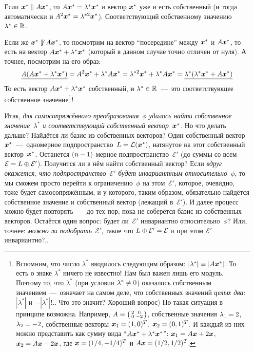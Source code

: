 \documentclass[a4paper,12pt]{article}
\theoremstyle{remark}
\begin{document}
  Если $\bds x^* \hm\parallel A \bds x^*$, то $A \bds x^* \hm= \lambda^* \bds x^*$ и вектор $\boldsymbol x^*$ уже и есть собственный (и тогда автоматически и $A^2 \bds x^* \hm= \lambda^{*2} \bds x^*$).
  Соответствующий собственному значению~$\lambda^* \hm\in \RR$.
  
  Если же $\bds x^* \hm{\not\parallel} A \bds x^*$, то посмотрим на вектор ``посередине'' между $\boldsymbol x^*$ и $A \boldsymbol x^*$, то есть на вектор $A \bds x^* \hm+ \lambda^* \bds x^*$ (который в данном случае точно отличен от нуля).
  А точнее, посмотрим на его образ:
  \[
    \underline{A (A \boldsymbol x^* + \lambda^* \boldsymbol x^*)} = A^2 \boldsymbol x^* + \lambda^* A \boldsymbol x^* = \lambda^{*2} \boldsymbol x^* + \lambda^* A \boldsymbol x^* = \underline{\lambda^* (\lambda^* \boldsymbol x^* + A \boldsymbol x^*)}
  \]
  То есть вектор $A \bds x^* \hm+ \lambda^* \bds x^*$ собственный, и $\lambda^* \hm\in \RR$~---~это соответствующее собственное значение\footnote{Вспомним, что число $\lambda^*$ вводилось следующим образом: $|\lambda^*| \hm\equiv |A \bds x^*|$. То есть о знаке $\lambda^*$ ничего не известно! Нам был важен лишь его модуль. Поэтому то, что $\lambda^*$ (при условии $\lambda^* \hm{\not=} 0$) оказалось собственным значением~---~означает на самом деле, что собственных значений \emph{целых два}: $|\lambda^*|$ и $-|\lambda^*|$!.. Что это значит? Хороший вопрос) Но такая ситуация в принципе возможна. Например, $A \hm= \left(\begin{smallmatrix}2 & 0 \\ 0 & -2\end{smallmatrix}\right)$, собственные значения $\lambda_1 \hm= 2$, $\lambda_2 \hm= -2$, собственные векторы $\bds x_1 \hm= (1, 0)^T$, $\bds x_2 \hm= (0, 1)^T$. И каждый из них можно представить как сумму вида ``$A \bds x^* \hm+ \lambda^* \bds x^*$'': $\bds x_1 \hm= A \bds x \hm+ 2 \bds x$, $\bds x_2 \hm= A \bds x \hm- 2 \bds x$, где $\bds x \hm= (1/4, -1/4)^T$ и $A \bds x \hm= (1/2, 1/2)^T$.}!
  
  Итак, \emph{для самосопряжённого преобразования~$\phi$ удалось найти собственное значение~$\lambda^*$ и соответствующий собственный вектор~$\boldsymbol x^*$}.
  Но что делать дальше?
  Найдётся ли базис из собственных векторов?
  Один собственный вектор~$\boldsymbol x^*$~---~одномерное подпространство~$L \hm= \mathcal L(\bds x^*)$, натянутое на этот собственный вектор~$\boldsymbol x^*$.
  Останется $(n \hm- 1)$-мерное подпространство~$\mathcal E'$ (до суммы со всем~$\mathcal E \hm= L \hm\oplus \mathcal E'$).
  Получится ли в нём найти собственный вектор?
  Если \emph{вдруг окажется, что подпространство~$\mathcal E'$ будет инвариантным относительно~$\phi$}, то мы сможем просто перейти к ограничению~$\phi$ на этом~$\mathcal E'$, которое, очевидно, тоже будет самосопряжённым, и у которого, таким образом, обязательно найдётся собственное значение и собственный вектор (лежащий в~$\mathcal E'$).
  И далее процесс можно будет повторять~---~до тех пор, пока не соберётся базис из собственных векторов.
  Остаётся один вопрос: будет ли~$\mathcal E'$ инвариантно относительно~$\phi$?
  Или, точнее: \emph{можно ли подобрать~$\mathcal E'$}, такое что $L \hm\oplus \mathcal E' \hm= \mathcal E$ и при этом $\mathcal E'$ инвариантно?..
  
\end{document}
